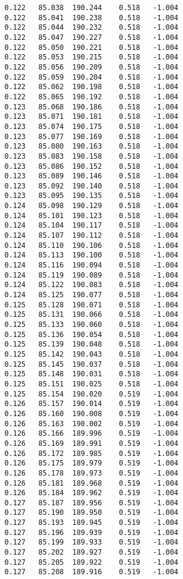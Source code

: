 \begin{verbatim}
   0.122   85.038  190.244    0.518   -1.004
   0.122   85.041  190.238    0.518   -1.004
   0.122   85.044  190.232    0.518   -1.004
   0.122   85.047  190.227    0.518   -1.004
   0.122   85.050  190.221    0.518   -1.004
   0.122   85.053  190.215    0.518   -1.004
   0.122   85.056  190.209    0.518   -1.004
   0.122   85.059  190.204    0.518   -1.004
   0.122   85.062  190.198    0.518   -1.004
   0.122   85.065  190.192    0.518   -1.004
   0.123   85.068  190.186    0.518   -1.004
   0.123   85.071  190.181    0.518   -1.004
   0.123   85.074  190.175    0.518   -1.004
   0.123   85.077  190.169    0.518   -1.004
   0.123   85.080  190.163    0.518   -1.004
   0.123   85.083  190.158    0.518   -1.004
   0.123   85.086  190.152    0.518   -1.004
   0.123   85.089  190.146    0.518   -1.004
   0.123   85.092  190.140    0.518   -1.004
   0.123   85.095  190.135    0.518   -1.004
   0.124   85.098  190.129    0.518   -1.004
   0.124   85.101  190.123    0.518   -1.004
   0.124   85.104  190.117    0.518   -1.004
   0.124   85.107  190.112    0.518   -1.004
   0.124   85.110  190.106    0.518   -1.004
   0.124   85.113  190.100    0.518   -1.004
   0.124   85.116  190.094    0.518   -1.004
   0.124   85.119  190.089    0.518   -1.004
   0.124   85.122  190.083    0.518   -1.004
   0.124   85.125  190.077    0.518   -1.004
   0.125   85.128  190.071    0.518   -1.004
   0.125   85.131  190.066    0.518   -1.004
   0.125   85.133  190.060    0.518   -1.004
   0.125   85.136  190.054    0.518   -1.004
   0.125   85.139  190.048    0.518   -1.004
   0.125   85.142  190.043    0.518   -1.004
   0.125   85.145  190.037    0.518   -1.004
   0.125   85.148  190.031    0.518   -1.004
   0.125   85.151  190.025    0.518   -1.004
   0.125   85.154  190.020    0.519   -1.004
   0.126   85.157  190.014    0.519   -1.004
   0.126   85.160  190.008    0.519   -1.004
   0.126   85.163  190.002    0.519   -1.004
   0.126   85.166  189.996    0.519   -1.004
   0.126   85.169  189.991    0.519   -1.004
   0.126   85.172  189.985    0.519   -1.004
   0.126   85.175  189.979    0.519   -1.004
   0.126   85.178  189.973    0.519   -1.004
   0.126   85.181  189.968    0.519   -1.004
   0.126   85.184  189.962    0.519   -1.004
   0.127   85.187  189.956    0.519   -1.004
   0.127   85.190  189.950    0.519   -1.004
   0.127   85.193  189.945    0.519   -1.004
   0.127   85.196  189.939    0.519   -1.004
   0.127   85.199  189.933    0.519   -1.004
   0.127   85.202  189.927    0.519   -1.004
   0.127   85.205  189.922    0.519   -1.004
   0.127   85.208  189.916    0.519   -1.004

\end{verbatim}
